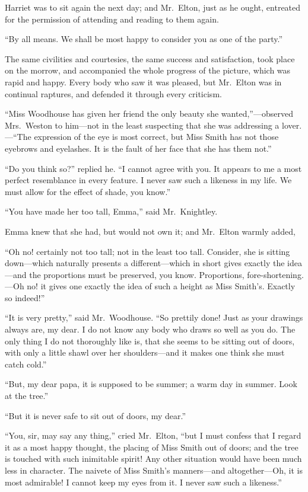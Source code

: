 Harriet was to sit again the next day; and Mr.\ Elton, just as he ought,
entreated for the permission of attending and reading to them again.

``By all means.  We shall be most happy to consider you as one
of the party.''

The same civilities and courtesies, the same success and satisfaction,
took place on the morrow, and accompanied the whole progress
of the picture, which was rapid and happy.  Every body who saw it
was pleased, but Mr.\ Elton was in continual raptures, and defended
it through every criticism.

``Miss Woodhouse has given her friend the only beauty she
wanted,''---observed Mrs.\ Weston to him---not in the least suspecting
that she was addressing a lover.---``The expression of the eye is
most correct, but Miss Smith has not those eyebrows and eyelashes.
It is the fault of her face that she has them not.''

``Do you think so?'' replied he.  ``I cannot agree with you.
It appears to me a most perfect resemblance in every feature.
I never saw such a likeness in my life.  We must allow for the effect
of shade, you know.''

``You have made her too tall, Emma,'' said Mr.\ Knightley.

Emma knew that she had, but would not own it; and Mr.\ Elton warmly added,

``Oh no! certainly not too tall; not in the least too tall.  Consider,
she is sitting down---which naturally presents a different---which
in short gives exactly the idea---and the proportions must
be preserved, you know.  Proportions, fore-shortening.---Oh no! it
gives one exactly the idea of such a height as Miss Smith's. Exactly so indeed!''

``It is very pretty,'' said Mr.\ Woodhouse.  ``So prettily done! Just
as your drawings always are, my dear.  I do not know any body who draws
so well as you do.  The only thing I do not thoroughly like is,
that she seems to be sitting out of doors, with only a little shawl
over her shoulders---and it makes one think she must catch cold.''

``But, my dear papa, it is supposed to be summer; a warm day in summer.
Look at the tree.''

``But it is never safe to sit out of doors, my dear.''

``You, sir, may say any thing,'' cried Mr.\ Elton, ``but I must confess
that I regard it as a most happy thought, the placing of Miss
Smith out of doors; and the tree is touched with such inimitable
spirit! Any other situation would have been much less in character.
The naivete of Miss Smith's manners---and altogether---Oh, it is
most admirable! I cannot keep my eyes from it.  I never saw such
a likeness.''

